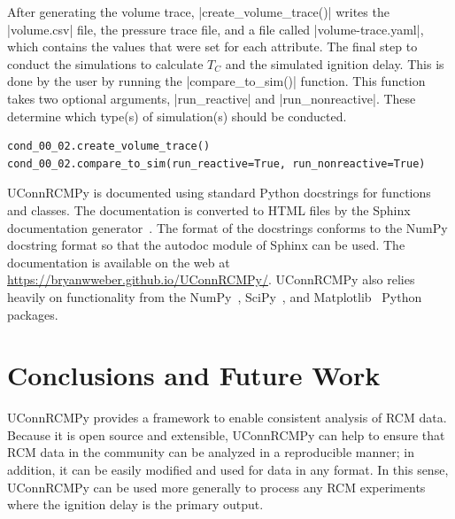 \documentclass[12pt]{../ussci}
\begin{document}
After generating the volume trace, \python|create_volume_trace()| writes the
\python|volume.csv| file, the pressure trace file, and a file called
\python|volume-trace.yaml|, which contains the values that were set for each
attribute. The final step to conduct the simulations to calculate \(T_C\) and
the simulated ignition delay. This is done by the user by running the
\python|compare_to_sim()| function. This function takes two optional arguments,
\python|run_reactive| and \python|run_nonreactive|. These determine which
type(s) of simulation(s) should be conducted.

\begin{verbatim}
cond_00_02.create_volume_trace()
cond_00_02.compare_to_sim(run_reactive=True, run_nonreactive=True)
\end{verbatim}


UConnRCMPy is documented using standard Python docstrings for functions and
classes. The documentation is converted to HTML files by the Sphinx
documentation generator~\autocite{Brandl2016}. The format of the docstrings
conforms to the NumPy docstring format so that the autodoc module of Sphinx can
be used. The documentation is available on the web at
\url{https://bryanwweber.github.io/UConnRCMPy/}. UConnRCMPy also relies heavily
on functionality from the NumPy~\autocite{vanderWalt2011},
SciPy~\autocite{Jones2001}, and Matplotlib~\autocite{Hunter2007} Python
packages.


\section{Conclusions and Future Work}\label{conclusions-and-future-work}

UConnRCMPy provides a framework to enable consistent analysis of RCM data.
Because it is open source and extensible, UConnRCMPy can help to ensure that RCM
data in the community can be analyzed in a reproducible manner; in addition, it
can be easily modified and used for data in any format. In this sense,
UConnRCMPy can be used more generally to process any RCM experiments where the
ignition delay is the primary output.
\end{document}

